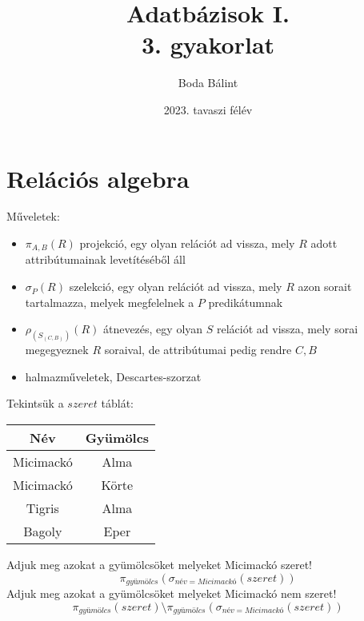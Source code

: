 \documentclass[a4paper,12pt]{article}
\title{\huge{Adatbázisok I.} \\[-4pt] \large 3. gyakorlat \vspace{-15pt}}
\author{Boda Bálint}
\date{\vspace{-12pt}2023. tavaszi félév}
\theoremstyle{definition}
\begin{document}
\maketitle
\section*{Relációs algebra}

Műveletek:
\begin{itemize}
	\item {
		$ \pi_{A,B}{\left( R \right) } $ projekció, egy olyan relációt ad vissza, mely $R$ adott attribútumainak levetítéséből áll
	}
	\item {
		$ \sigma_{P}{\left( R \right)} $ szelekció, egy olyan relációt ad vissza, mely $R$ azon sorait tartalmazza, melyek megfelelnek a $P$ predikátumnak
	}
	\item {
		$ \rho_{(S_{(C,B)})}{\left( R \right)} $ átnevezés, egy olyan $S$ relációt ad vissza, mely sorai megegyeznek $R$ soraival, de attribútumai pedig rendre $ C,B $
	}
	\item {
		halmazműveletek, Descartes-szorzat
	}
\end{itemize}
\noindent
Tekintsük a $ szeret $ táblát:
\begin{table}[H]
	\centering
	\begin{tabular}{|c|c|}
		\hline
		Név & Gyümölcs \\
		\hline
		Micimackó & Alma \\
		\hline
		Micimackó & Körte \\
		\hline
		Tigris & Alma \\
		\hline
		Bagoly & Eper \\
		\hline
	\end{tabular}
\end{table}
	
\noindent
Adjuk meg azokat a gyümölcsöket melyeket Micimackó szeret!
\[
\pi_{gyümölcs}{\left(  \sigma_{név = Micimackó}{\left( szeret  \right) }\right) }
\]
Adjuk meg azokat a gyümölcsöket melyeket Micimackó nem szeret!
\[
\pi_{gyümölcs}{\left( szeret \right)} \setminus \pi_{gyümölcs}{\left(  \sigma_{név = Micimackó}{\left( szeret  \right) }\right) }
\]
\end{document}
